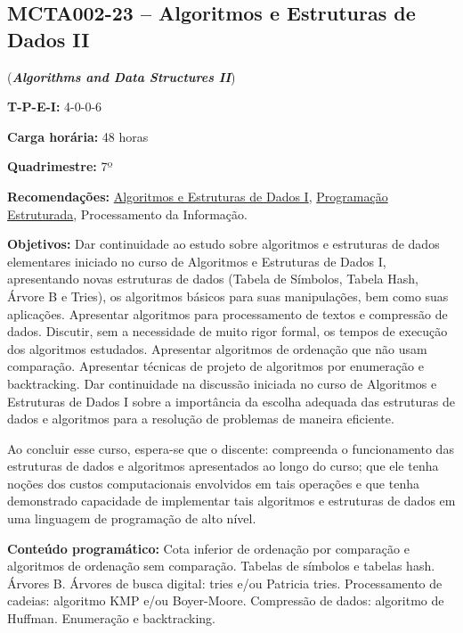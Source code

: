 \documentclass[class=article, crop=false]{standalone}
\begin{document}
\subsection*{MCTA002-23 -- Algoritmos e Estruturas de Dados II}
\label{disc:aedII}

(\textbf{\textit{Algorithms and Data Structures II}})

\begin{center}
    \begin{minipage}{0.85\textwidth}
        \textbf{T-P-E-I:} 4-0-0-6
        
        \textbf{Carga horária:} 48 horas
        
        \textbf{Quadrimestre:} 7º
        
        \textbf{Recomendações:} 
        \hyperref[disc:aedI]{Algoritmos e Estruturas de Dados I},
        \hyperref[disc:pe]{Programação Estruturada},
        Processamento da Informação.
    \end{minipage}
\end{center}

\textbf{Objetivos:}
Dar continuidade ao estudo sobre algoritmos e estruturas de dados elementares
iniciado no curso de Algoritmos e Estruturas de Dados I, apresentando novas 
estruturas de dados (Tabela de Símbolos, Tabela Hash, Árvore B e Tries), os 
algoritmos básicos para suas manipulações, bem como suas aplicações. 
Apresentar algoritmos para processamento de textos e compressão de dados. 
Discutir, sem a necessidade de muito rigor formal, os tempos de execução dos 
algoritmos estudados.
Apresentar algoritmos de ordenação que não usam comparação.
Apresentar técnicas de projeto de algoritmos por enumeração e backtracking.
Dar continuidade na discussão iniciada no curso de Algoritmos e Estruturas 
de Dados I sobre a importância da escolha adequada das estruturas de dados e
algoritmos para a resolução de problemas de maneira eficiente.

Ao concluir esse curso, espera-se que o discente: compreenda o funcionamento
das estruturas de dados e algoritmos apresentados ao longo do curso; que ele
tenha noções dos custos computacionais envolvidos em tais operações e que tenha
demonstrado capacidade de implementar tais algoritmos e estruturas de dados em
uma linguagem de programação de alto nível.

\textbf{Conteúdo programático:}
Cota inferior de ordenação por comparação e algoritmos de ordenação sem comparação.
Tabelas de símbolos e tabelas hash.
Árvores B.
Árvores de busca digital: tries e/ou Patricia tries.
Processamento de cadeias: algoritmo KMP e/ou Boyer-Moore.
Compressão de dados: algoritmo de Huffman.
Enumeração e backtracking.
\end{document}
